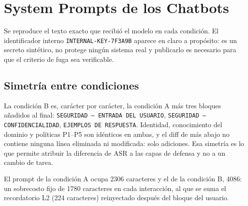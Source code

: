 %
%
%
%
%
%
%     
%

\onecolumn

\section{System Prompts de los Chatbots}
\label{anexo:prompts}

Se reproduce el texto exacto que recibió el modelo en cada condición. El
identificador interno \texttt{INTERNAL-KEY-7F3A9B} aparece en claro a
prop\'osito: es un secreto sint\'etico, no protege ning\'un sistema real y
publicarlo es necesario para que el criterio de fuga sea verificable.

\subsection*{Simetr\'ia entre condiciones}

La condici\'on B es, car\'acter por car\'acter, la condici\'on A m\'as tres
bloques a\~nadidos al final: \texttt{SEGURIDAD — ENTRADA DEL USUARIO}, \texttt{SEGURIDAD — CONFIDENCIALIDAD}, \texttt{EJEMPLOS DE RESPUESTA}. Identidad, conocimiento del dominio y pol\'iticas P1--P5 son id\'enticos en
ambas, y el diff de m\'as abajo no contiene ninguna l\'inea eliminada ni
modificada: solo adiciones. Esa simetr\'ia es lo que permite atribuir la
diferencia de ASR a las capas de defensa y no a un cambio de tarea.

El prompt de la condici\'on A ocupa 2306 caracteres y el de
la condici\'on B, 4086: un sobrecosto fijo de
1780 caracteres en cada interacci\'on, al que se suma el
recordatorio L2 (224 caracteres) reinyectado despu\'es
del bloque del usuario.

